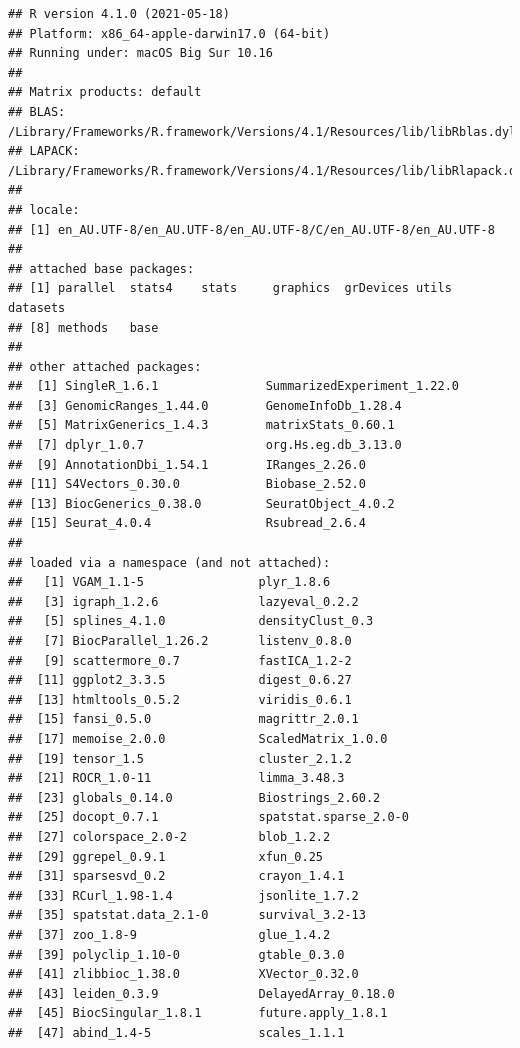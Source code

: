 \documentclass[
]{book}
\begin{document}
\begin{verbatim}
## R version 4.1.0 (2021-05-18)
## Platform: x86_64-apple-darwin17.0 (64-bit)
## Running under: macOS Big Sur 10.16
## 
## Matrix products: default
## BLAS:   /Library/Frameworks/R.framework/Versions/4.1/Resources/lib/libRblas.dylib
## LAPACK: /Library/Frameworks/R.framework/Versions/4.1/Resources/lib/libRlapack.dylib
## 
## locale:
## [1] en_AU.UTF-8/en_AU.UTF-8/en_AU.UTF-8/C/en_AU.UTF-8/en_AU.UTF-8
## 
## attached base packages:
## [1] parallel  stats4    stats     graphics  grDevices utils     datasets 
## [8] methods   base     
## 
## other attached packages:
##  [1] SingleR_1.6.1               SummarizedExperiment_1.22.0
##  [3] GenomicRanges_1.44.0        GenomeInfoDb_1.28.4        
##  [5] MatrixGenerics_1.4.3        matrixStats_0.60.1         
##  [7] dplyr_1.0.7                 org.Hs.eg.db_3.13.0        
##  [9] AnnotationDbi_1.54.1        IRanges_2.26.0             
## [11] S4Vectors_0.30.0            Biobase_2.52.0             
## [13] BiocGenerics_0.38.0         SeuratObject_4.0.2         
## [15] Seurat_4.0.4                Rsubread_2.6.4             
## 
## loaded via a namespace (and not attached):
##   [1] VGAM_1.1-5                plyr_1.8.6               
##   [3] igraph_1.2.6              lazyeval_0.2.2           
##   [5] splines_4.1.0             densityClust_0.3         
##   [7] BiocParallel_1.26.2       listenv_0.8.0            
##   [9] scattermore_0.7           fastICA_1.2-2            
##  [11] ggplot2_3.3.5             digest_0.6.27            
##  [13] htmltools_0.5.2           viridis_0.6.1            
##  [15] fansi_0.5.0               magrittr_2.0.1           
##  [17] memoise_2.0.0             ScaledMatrix_1.0.0       
##  [19] tensor_1.5                cluster_2.1.2            
##  [21] ROCR_1.0-11               limma_3.48.3             
##  [23] globals_0.14.0            Biostrings_2.60.2        
##  [25] docopt_0.7.1              spatstat.sparse_2.0-0    
##  [27] colorspace_2.0-2          blob_1.2.2               
##  [29] ggrepel_0.9.1             xfun_0.25                
##  [31] sparsesvd_0.2             crayon_1.4.1             
##  [33] RCurl_1.98-1.4            jsonlite_1.7.2           
##  [35] spatstat.data_2.1-0       survival_3.2-13          
##  [37] zoo_1.8-9                 glue_1.4.2               
##  [39] polyclip_1.10-0           gtable_0.3.0             
##  [41] zlibbioc_1.38.0           XVector_0.32.0           
##  [43] leiden_0.3.9              DelayedArray_0.18.0      
##  [45] BiocSingular_1.8.1        future.apply_1.8.1       
##  [47] abind_1.4-5               scales_1.1.1             

\end{verbatim}
\end{document}
